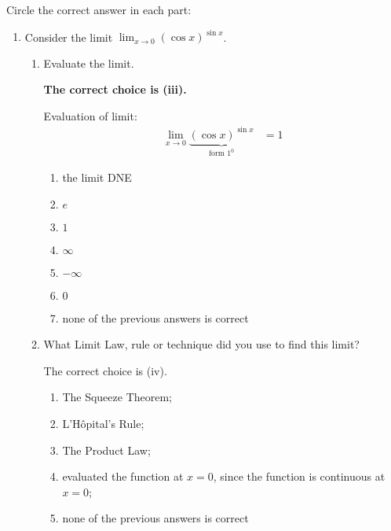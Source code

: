 \documentclass[nooutcomes]{ximera}
\begin{document}
\begin{problem}

  Circle the correct answer in each part:
  \begin{enumerate}
    \item
      Consider the limit $\lim_{x \to 0} (\cos x)^{\sin x}$.
      \begin{enumerate}
        \item
          Evaluate the limit.
          \begin{freeResponse}
            \textbf{The correct choice is (iii).}

            Evaluation of limit:
            \begin{align*}
              \lim_{x \to 0} \underbrace{(\cos x)^{\sin x}}_{\text{form $1^0$}} &= 1
            \end{align*}
          \end{freeResponse}
          \begin{enumerate}
            \item
              the limit DNE
            \item
              $e$
             \item
              $1$
            \item
              $\infty$
            \item
              $-\infty$
            \item
              $0$
            \item
              none of the previous answers is correct
          \end{enumerate}
        \item
          What Limit Law, rule or technique did you use to find this limit?
          \begin{freeResponse}
            The correct choice is (iv).
          \end{freeResponse}
          \begin{enumerate}
            \item
              The Squeeze Theorem;
            \item
              L'H\^{o}pital's Rule;
            \item
              The Product Law;
            \item
              evaluated the function at $x = 0$, since the function is continuous at $x = 0$;
            \item
              none of the previous answers is correct
          \end{enumerate}
      \end{enumerate}


\end{enumerate}
\end{problem}
\end{document}
